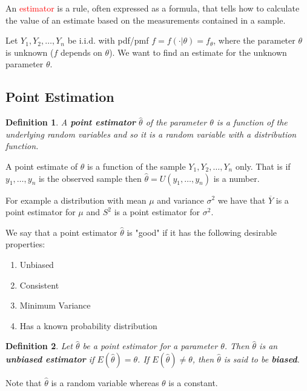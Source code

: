 \documentclass[a4paper,12pt]{article}
\theoremstyle{nonitalic}
\newtheorem{definition}{Definition}[subsection]
\begin{document}
    \bigskip

    An \textcolor{red}{estimator} is a rule, often expressed as a formula, that tells how to calculate the value of an estimate based on the measurements contained in a sample.
    
    \bigskip

    Let \( Y_1, Y_2, \ldots, Y_n \) be i.i.d. with pdf/pmf \( f = f(\cdot|\theta) = f_\theta \), where the parameter \(\theta\) is unknown ($f$ depends on $\theta$). We want to find an estimate for the unknown parameter \(\theta\).

    \subsection{Point Estimation}
    \begin{definition}
        A \textbf{point estimator} $\hat{\theta}$ of the parameter \(\theta\) is a function of the underlying random variables and so it is a random variable with a distribution function.
    \end{definition}

    \bigskip

    A point estimate of \(\theta\) is a function of the sample \(Y_1, Y_2, \ldots, Y_n\) only. That is if $y_1, \ldots, y_n$ is the observed sample then $\hat{\theta} = U(y_1, \ldots, y_n)$ is a number.

    \bigskip

    For example a distribution with mean $\mu$ and variance $\sigma^2$ we have that $\overline{Y}$ is a point estimator for $\mu$ and $S^2$ is a point estimator for $\sigma^2$.

    \bigskip

    We say that a point estimator $\hat{\theta}$ is "good" if it has the following desirable properties:
    \begin{enumerate}
        \item Unbiased
        \item Consistent
        \item Minimum Variance
        \item Has a known probability distribution
    \end{enumerate}
    
    \begin{definition}
        Let $\hat{\theta}$ be a point estimator for a parameter $\theta$. Then $\hat{\theta}$ is an \textbf{unbiased estimator} if $E(\hat{\theta}) = \theta$. If $E(\hat{\theta}) \neq \theta$, then $\hat{\theta}$ is said to be \textbf{biased}.
    \end{definition}
    Note that $\hat{\theta}$ is a random variable whereas $\theta$ is a constant.
\end{document}
